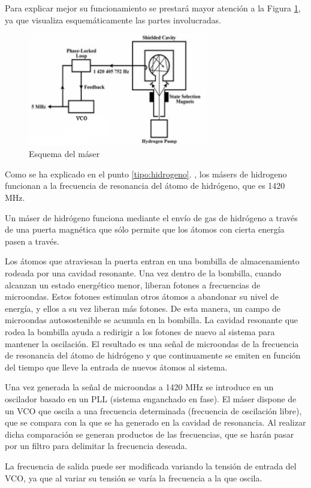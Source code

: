 Para explicar mejor su funcionamiento se prestará mayor atención a la Figura \ref{fig:esquema_maser}, ya que visualiza esquemáticamente las partes involucradas.

\begin{figure}[hb!!]
 \centering
 \includegraphics[width=0.7\textwidth]{./Utils/maser_esquema.png}
 \caption{Esquema del m\'aser}
 \label{fig:esquema_maser}
\end{figure}

Como se ha explicado en el punto \ref{tipo:hidrogeno}. , los m\'asers de hidrogeno funcionan a la frecuencia de resonancia del átomo de hidrógeno, que es 1420 MHz. 

Un máser de hidrógeno funciona mediante el envío de gas de hidrógeno a través de una puerta magnética que sólo permite que los átomos con cierta energía pasen a través. 

Los átomos que atraviesan la puerta entran en una bombilla de almacenamiento rodeada por una cavidad resonante. Una vez dentro de la bombilla, cuando alcanzan un estado energético menor, liberan fotones a frecuencias de microondas. Estos fotones estimulan otros átomos a abandonar su nivel de energía, y ellos a su vez liberan más fotones. De esta manera, un campo de microondas autosostenible se acumula en la bombilla. La cavidad resonante que rodea la bombilla ayuda a redirigir a los fotones de nuevo al sistema para mantener la oscilación. El resultado es una señal de microondas de la frecuencia de resonancia del átomo de hidrógeno y que continuamente se emiten en función del tiempo que lleve la entrada de nuevos átomos al sistema.

Una vez generada la señal de microondas a 1420 MHz se introduce en un oscilador basado en un PLL (sistema enganchado en fase). El m\'aser dispone de un VCO que oscila a una frecuencia determinada (frecuencia de oscilación libre), que se compara con la que se ha generado en la cavidad de resonancia. Al realizar dicha comparación se generan productos de las frecuencias, que se har\'an pasar por un filtro para delimitar la frecuencia deseada.

La frecuencia de salida puede ser modificada variando la tensión de entrada del VCO, ya que al variar su tensión se var\'ia la frecuencia a la que oscila.
